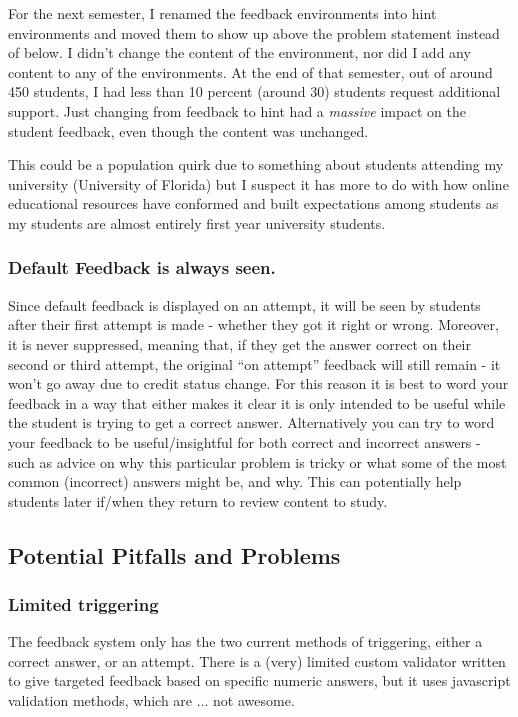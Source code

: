 \documentclass{ximera}
\begin{document}
            For the next semester, I renamed the feedback environments into hint environments and moved them to show up above the problem statement instead of below. I didn't change the content of the environment, nor did I add any content to any of the environments. At the end of that semester, out of around 450 students, I had less than 10 percent (around 30) students request additional support. Just changing from feedback to hint had a \textit{massive} impact on the student feedback, even though the content was unchanged. 
            
            This could be a population quirk due to something about students attending my university (University of Florida) but I suspect it has more to do with how online educational resources have conformed and built expectations among students as my students are almost entirely first year university students.
            
        \subsubsection*{Default Feedback is always seen.}
            Since default feedback is displayed on an attempt, it will be seen by students after their first attempt is made - whether they got it right or wrong. Moreover, it is never suppressed, meaning that, if they get the answer correct on their second or third attempt, the original ``on attempt'' feedback will still remain - it won't go away due to credit status change. For this reason it is best to word your feedback in a way that either makes it clear it is only intended to be useful while the student is trying to get a correct answer. Alternatively you can try to word your feedback to be useful/insightful for both correct and incorrect answers - such as advice on why this particular problem is tricky or what some of the most common (incorrect) answers might be, and why. This can potentially help students later if/when they return to review content to study.
        
        
    \subsection*{Potential Pitfalls and Problems}   
        
        \subsubsection*{Limited triggering}
            The feedback system only has the two current methods of triggering, either a correct answer, or an attempt. There is a (very) limited custom validator written to give targeted feedback based on specific numeric answers, but it uses javascript validation methods, which are ... not awesome. 
            
\end{document}
